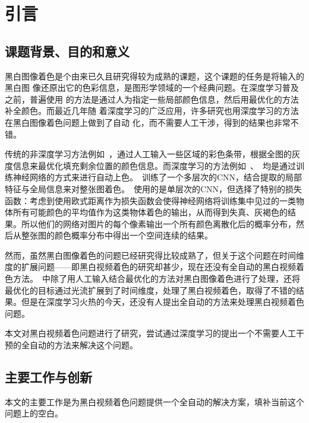 \chapter{引言}
\label{cha:intro}

\section{课题背景、目的和意义}
\label{sec:intro}

  黑白图像着色是个由来已久且研究得较为成熟的课题，这个课题的任务是将输入的黑白图
  像还原出它的色彩信息，是图形学领域的一个经典问题。在深度学习普及之前，普遍使用
  的方法是通过人为指定一些局部颜色信息，然后用最优化的方法补全颜色。而最近几年随
  着深度学习的广泛应用，许多研究也用深度学习的方法在黑白图像着色问题上做到了自动
  化，而不需要人工干涉，得到的结果也非常不错。

  传统的非深度学习方法例如~，通过人工输入一些区域的彩色条带，根据全图的灰度信息来最优化填充剩余位置的颜色信息。而深度学习的方法例如~、~均是通过训练神经网络的方式来进行自动上色。~训练了一个多层次的CNN，结合提取的局部特征与全局信息来对整张图着色。~使用的是单层次的CNN，但选择了特别的损失函数：考虑到使用欧式距离作为损失函数会使得神经网络将训练集中见过的一类物体所有可能颜色的平均值作为这类物体着色的输出，从而得到失真、灰褐色的结果。所以他们的网络对图片的每个像素输出一个所有颜色离散化后的概率分布，然后从整张图的颜色概率分布中得出一个空间连续的结果。

  然而，虽然黑白图像着色的问题已经研究得比较成熟了，但关于这个问题在时间维度的扩展问题——即黑白视频着色的研究却甚少，现在还没有全自动的黑白视频着色方法。~中除了用人工输入结合最优化的方法对黑白图像着色进行了处理，还将最优化的目标通过光流扩展到了时间维度，处理了黑白视频着色，取得了不错的结果。但是在深度学习火热的今天，还没有人提出全自动的方法来处理黑白视频着色问题。

  本文对黑白视频着色问题进行了研究，尝试通过深度学习的提出一个不需要人工干预的全自动的方法来解决这个问题。

\section{主要工作与创新}
\label{sec:works}

  本文的主要工作是为黑白视频着色问题提供一个全自动的解决方案，填补当前这个问题上的空白。

